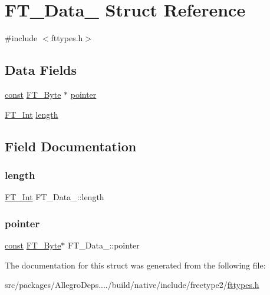 \hypertarget{struct_f_t___data__}{}\section{F\+T\+\_\+\+Data\+\_\+ Struct Reference}
\label{struct_f_t___data__}


{\ttfamily \#include $<$fttypes.\+h$>$}

\subsection*{Data Fields}
\begin{DoxyCompactItemize}
\item 
\hyperlink{zconf_8h_a2c212835823e3c54a8ab6d95c652660e}{const} \hyperlink{fttypes_8h_a51f26183ca0c9f4af958939648caeccd}{F\+T\+\_\+\+Byte} $\ast$ \hyperlink{struct_f_t___data___a4dea731b8a256b973757e1b8f612b050}{pointer}
\item 
\hyperlink{fttypes_8h_af90e5fb0d07e21be9fe6faa33f02484c}{F\+T\+\_\+\+Int} \hyperlink{struct_f_t___data___af60c89dccd1852aceb0dc08675aca2fd}{length}
\end{DoxyCompactItemize}


\subsection{Field Documentation}
\mbox{\label{struct_f_t___data___af60c89dccd1852aceb0dc08675aca2fd}} 
\subsubsection{\texorpdfstring{length}{length}}
{\footnotesize\ttfamily \hyperlink{fttypes_8h_af90e5fb0d07e21be9fe6faa33f02484c}{F\+T\+\_\+\+Int} F\+T\+\_\+\+Data\+\_\+\+::length}

\mbox{\label{struct_f_t___data___a4dea731b8a256b973757e1b8f612b050}} 
\subsubsection{\texorpdfstring{pointer}{pointer}}
{\footnotesize\ttfamily \hyperlink{zconf_8h_a2c212835823e3c54a8ab6d95c652660e}{const} \hyperlink{fttypes_8h_a51f26183ca0c9f4af958939648caeccd}{F\+T\+\_\+\+Byte}$\ast$ F\+T\+\_\+\+Data\+\_\+\+::pointer}



The documentation for this struct was generated from the following file\+:\begin{DoxyCompactItemize}
\item 
src/packages/\+Allegro\+Deps..../build/native/include/freetype2/\hyperlink{fttypes_8h}{fttypes.\+h}\end{DoxyCompactItemize}

